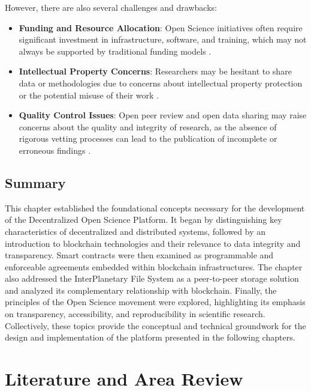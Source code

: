 \documentclass[final]{rc-book-2.14}
\begin{document}
However, there are also several challenges and drawbacks:

\begin{itemize}
    \item \textbf{Funding and Resource Allocation}: Open Science initiatives often require significant investment in infrastructure, software, and training, which may not always be supported by traditional funding models \cite{Borgman2012}.
    \item \textbf{Intellectual Property Concerns}: Researchers may be hesitant to share data or methodologies due to concerns about intellectual property protection or the potential misuse of their work \cite{Boulton2015}.
    \item \textbf{Quality Control Issues}: Open peer review and open data sharing may raise concerns about the quality and integrity of research, as the absence of rigorous vetting processes can lead to the publication of incomplete or erroneous findings \cite{Piwowar2011}.
\end{itemize}


\section{Summary}

This chapter established the foundational concepts necessary for the development of the Decentralized Open Science Platform. It began by distinguishing key characteristics of decentralized and distributed systems, followed by an introduction to blockchain technologies and their relevance to data integrity and transparency. Smart contracts were then examined as programmable and enforceable agreements embedded within blockchain infrastructures. The chapter also addressed the InterPlanetary File System as a peer-to-peer storage solution and analyzed its complementary relationship with blockchain. Finally, the principles of the Open Science movement were explored, highlighting its emphasis on transparency, accessibility, and reproducibility in scientific research. Collectively, these topics provide the conceptual and technical groundwork for the design and implementation of the platform presented in the following chapters.


\chapter{Literature and Area Review}
\label{chp:review}
\end{document}
